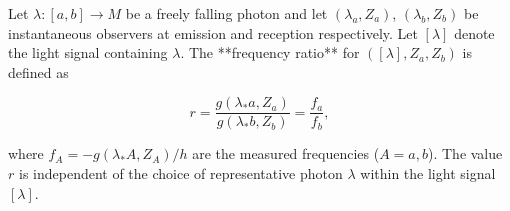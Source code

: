 Let $\lambda: [a, b] \to M$ be a freely falling photon and let $(\lambda_a, Z_a)$, $(\lambda_b, Z_b)$ be instantaneous observers at emission and reception respectively. Let $[\lambda]$ denote the light signal containing $\lambda$. The **frequency ratio** for $([\lambda], Z_a, Z_b)$ is defined as

$$r = \frac{g(\lambda_* a, Z_a)}{g(\lambda_* b, Z_b)} = \frac{f_a}{f_b},$$

where $f_A = -g(\lambda_* A, Z_A)/h$ are the measured frequencies ($A = a, b$). The value $r$ is independent of the choice of representative photon $\lambda$ within the light signal $[\lambda]$.
